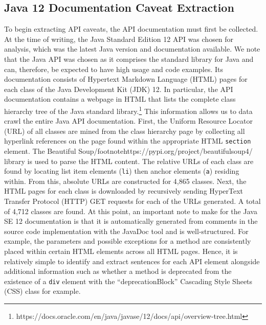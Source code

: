 \subsection{Java 12 Documentation Caveat Extraction}
\label{subsec:info-caveat-extract}
To begin extracting API caveats, the API documentation must first be collected. At the time of writing, the Java Standard Edition 12 API was chosen for analysis, which was the latest Java version and documentation available. We note that the Java API was chosen as it comprises the standard library for Java and can, therefore, be expected to have high usage and code examples. Its documentation consists of Hypertext Markdown Language (HTML) pages for each class of the Java Development Kit (JDK) 12. In particular, the API documentation contains a webpage in HTML that lists the complete class hierarchy tree of the Java standard library.\footnote{https://docs.oracle.com/en/java/javase/12/docs/api/overview-tree.html} This information allows us to data crawl the entire Java API documentation. First, the Uniform Resource Locator (URL) of all classes are mined from the class hierarchy page by collecting all hyperlink references on the page found within the appropriate HTML \lstinline{section} element. The Beautiful Soup/footnote{https://pypi.org/project/beautifulsoup4/} library is used to parse the HTML content. The relative URLs of each class are found by locating list item elements (\lstinline{li}) then anchor elements (\lstinline{a}) residing within. From this, absolute URLs are constructed for 4,865 classes. Next, the HTML pages for each class is downloaded by recursively sending HyperText Transfer Protocol (HTTP) GET requests for each of the URLs generated. A total of 4,712 classes are found. At this point, an important note to make for the Java SE 12 documentation is that it is automatically generated from comments in the source code implementation with the JavaDoc tool and is well-structured. For example, the parameters and possible exceptions for a method are consistently placed within certain HTML elements across all HTML pages. Hence, it is relatively simple to identify and extract sentences for each API element alongside additional information such as whether a method is deprecated from the existence of a \lstinline{div} element with the ``deprecationBlock'' Cascading Style Sheets (CSS) class for example.\\

